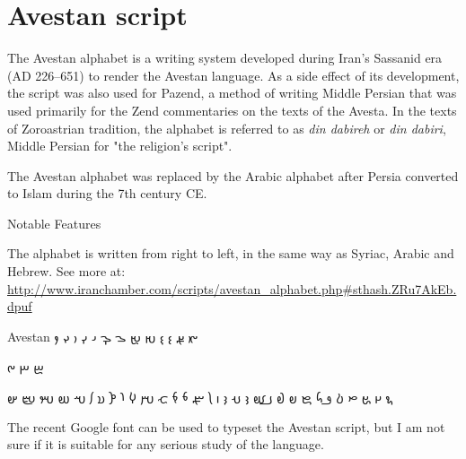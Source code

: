 \section{Avestan script}
\label{s:avestan}
The Avestan alphabet is a writing system developed during Iran's Sassanid era (AD 226–651) to render the Avestan language.
As a side effect of its development, the script was also used for Pazend, a method of writing Middle Persian that was used primarily for the Zend commentaries on the texts of the Avesta. In the texts of Zoroastrian tradition, the alphabet is referred to as \emph{din dabireh} or \emph{din dabiri}, Middle Persian for "the religion's script".

The Avestan alphabet was replaced by the Arabic alphabet after Persia converted to Islam during the 7th century CE. 


Notable Features

The alphabet is written from right to left, in the same way as Syriac, Arabic and Hebrew.
See more at: \url{http://www.iranchamber.com/scripts/avestan_alphabet.php#sthash.ZRu7AkEb.dpuf}


\begin{scriptexample}[]{Avestan}
\ifxetex{}
\beginR\fi
\avestan\raggedleft
𐬄	
𐬅	
𐬆	
𐬇	
𐬈	
𐬉	
𐬊	
𐬋	
𐬌	
𐬍	
𐬎	
𐬏	
𐬐	
	
𐬒	
𐬓	
𐬔	
	
𐬖	
𐬗	
𐬘	
𐬙	
𐬚	
𐬛	
𐬜	
𐬝	
𐬞	
𐬟	
𐬠	
𐬡	
𐬢	
𐬣	
𐬤	
𐬥	
𐬦	
𐬧	
𐬨	
𐬩	
𐬪	
𐬫	
𐬬	
𐬭	
𐬮	
𐬯	
𐬰	
𐬱	
𐬲	
𐬳	
𐬴	
𐬵	
\ifxetex\endR
{}\fi
\end{scriptexample}

The recent Google font  can be used to typeset the Avestan script, but I am not sure if it is suitable for any serious study of the language.
